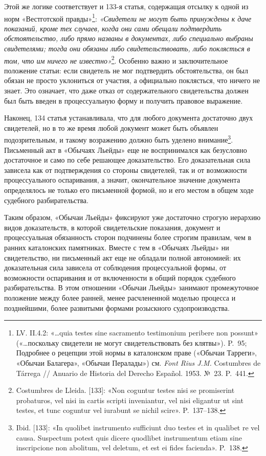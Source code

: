 Этой же логике соответствует и 133-я статья, содержащая отсылку к одной из норм «Вестготской правды»\footnote{LV. II.4.2: «…quia testes sine sacramento testimonium peribere non possunt» («…поскольку свидетели не могут свидетельствовать без клятвы»). P.~95; Подробнее о рецепции этой нормы в каталонском праве («Обычаи Тарреги», «Обычаи Балагера», «Обычаи Пералады») см. \emph{Font Rius J.M. }Costumbres de Tárrega // Anuario de Historia del Derecho Español. 1953. №~23. P.~441.}: \emph{«Свидетели не могут быть принуждены к даче показаний, кроме тех случаев, когда они сами обещали подтвердить обстоятельство, либо прямо названы в документах, либо специально выбраны свидетелями; тогда они обязаны либо свидетельствовать, либо поклясться в том, что им ничего не известно»}\footnote{Costumbres de Lleida. [133]: «Non coguntur testes nisi se promiserint probaturos, vel nisi in cartis scripti inveniantur, vel nisi eligantur ut sint testes, et tunc coguntur vel iurabunt se nichil scire». P.~137--138.}. Особенно важно и заключительное положение статьи: если свидетель не мог подтвердить обстоятельства, он был обязан не просто уклониться от участия, а официально поклясться, что ничего не знает. Это означает, что даже отказ от содержательного свидетельства должен был быть введен в процессуальную форму и получить правовое выражение.

Наконец, 134 статья устанавливала, что для любого документа достаточно двух свидетелей, но в то же время любой документ может быть объявлен подозрительным, и такому возражению должно быть уделено внимание\footnote{Ibid. [133]: «In quolibet instrumento sufficiunt duo testes et in qualibet re vel causa. Suspectum potest quis dicere quodlibet instrumentum etiam sine inscripcione non abolitum, vel deletum, et est ei fides facienda». P.~138.}. Письменный акт в «Обычаях Льейды» еще не воспринимался как безусловно достаточное и само по себе решающее доказательство. Его доказательная сила зависела как от подтверждения со стороны свидетелей, так и от возможности процессуального оспаривания, а значит, окончательное значение документа определялось не только его письменной формой, но и его местом в общем ходе судебного разбирательства.

Таким образом, «Обычаи Льейды» фиксируют уже достаточно строгую иерархию видов доказательств, в которой свидетельские показания, документ и процессуальная обязанность сторон подчинены более строгим правилам, чем в ранних каталонских памятниках. Вместе с тем в «Обычаях Льейды» ни свидетельство, ни письменный акт еще не обладали полной автономией: их доказательная сила зависела от соблюдения процессуальной формы, от возможности оспаривания и от включенности в общий порядок судебного разбирательства. В этом отношении «Обычаи Льейды» занимают промежуточное положение между более ранней, менее расчлененной моделью процесса и позднейшими, более развитыми формами розыскного судопроизводства.

